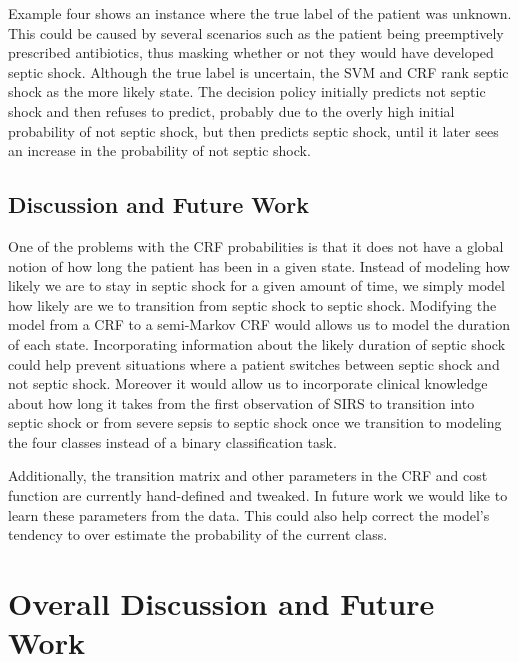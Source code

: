 \documentclass[12pt,solutions]{article}
\begin{document}
Example four shows an instance where the true label of the patient was unknown. This could be caused by several scenarios such as the patient being preemptively prescribed antibiotics, thus masking whether or not they would have developed septic shock. Although the true label is uncertain, the SVM and CRF rank septic shock as the more likely state. The decision policy initially predicts not septic shock and then refuses to predict, probably due to the overly high initial probability of not septic shock, but then predicts septic shock, until it later sees an increase in the probability of not septic shock.

\subsection{Discussion and Future Work}

One of the problems with the CRF probabilities is that it does not have a global notion of how long the patient has been in a given state. Instead of modeling how likely we are to stay in septic shock for a given amount of time, we simply model how likely are we to transition from septic shock to septic shock. Modifying the model from a CRF to a semi-Markov CRF would allows us to model the duration of each state. Incorporating information about the likely duration of septic shock could help prevent situations where a patient switches between septic shock and not septic shock. Moreover it would allow us to incorporate clinical knowledge about how long it takes from the first observation of SIRS to transition into septic shock or from severe sepsis to septic shock once we transition to modeling the four classes instead of a binary classification task.

Additionally, the transition matrix and other parameters in the CRF and cost function are currently hand-defined and tweaked. In future work we would like to learn these parameters from the data. This could also help correct the model's tendency to over estimate the probability of the current class.

\section{Overall Discussion and Future Work}
\end{document}
